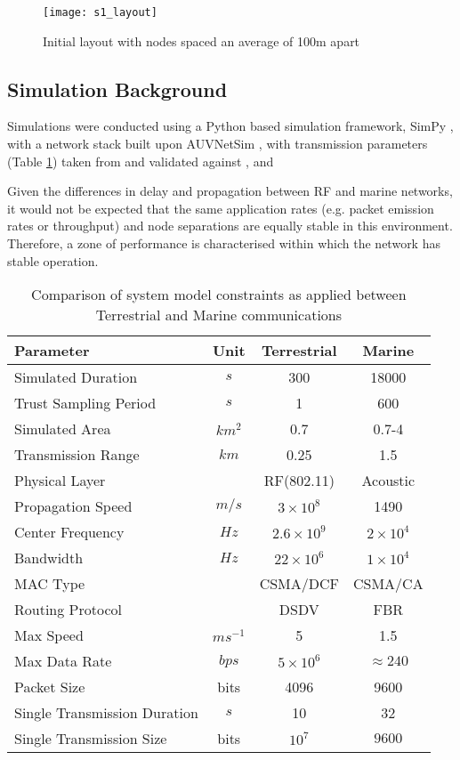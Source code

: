 %
\begin{figure}[h]
	\centering
	\texttt{[image: s1\_layout]}
	\caption{Initial layout with nodes spaced an average of 100m apart}
	\label{fig:s1_layout}
\end{figure}
%

\subsection{Simulation Background}

Simulations were conducted using a Python based simulation framework, SimPy \cite{Mueller2003SimPy}, with a network stack built upon AUVNetSim \cite{Miquel2008}, with transmission parameters (Table \ref{tab:sysconstraints}) taken from and validated against \cite{Stojanovic2007}, \cite{Stefanov2011} and \cite{Sehgal2010}

Given the differences in delay and propagation between RF and marine networks, it would not be expected that the same application rates (e.g. packet emission rates or throughput) and node separations are equally stable in this environment.
Therefore, a zone of performance is characterised within which the network has stable operation.
%
\begin{table}[h]
	\caption{Comparison of system model constraints as applied between Terrestrial and Marine communications} \label{tab:sysconstraints}
	\begin{center}
		\setlength{\tabcolsep}{8pt}
		\begin{tabular}{lccc}
			\toprule
			Parameter & Unit & Terrestrial & Marine \\
			\midrule
			Simulated Duration & $s$ & 300 & 18000\\
			Trust Sampling Period & $s$ & 1 & 600 \\
			Simulated Area & $km^2$ & 0.7 & 0.7-4 \\
			Transmission Range & $km$ & 0.25 & 1.5 \\
			Physical Layer & & RF(802.11) & Acoustic\\
			Propagation Speed& $m/s$ & $3\times10^8$ & 1490\\
			Center Frequency& $Hz$ & $2.6\times10^9$ & $2 \times 10^4$ \\
			Bandwidth& $Hz$ & $22\times10^6$ & $1\times10^4$\\
			MAC Type & & CSMA/DCF & CSMA/CA\\
			Routing Protocol & & DSDV & FBR \\
			Max Speed & $ms^{-1}$ & 5 & 1.5 \\
			Max Data Rate & $bps$ & $5\times10^6$ & $\approx 240$ \\
			Packet Size & bits & 4096 &  9600 \\
			Single Transmission Duration & $s$ & 10 & 32 \\
			Single Transmission Size & bits & $10^7$ & $9600$ \\
			\bottomrule
		\end{tabular}
		\setlength{\tabcolsep}{6pt}
	\end{center}
\end{table}
%


